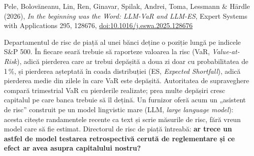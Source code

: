 
\renewcommand{\emqacase}{\T{Research case 5 (Lecture 12)}{Studiul de caz 5 (cursul 12)}}

%
          { Pele, Bolovăneanu, Lin, Ren, Ginavar, Spilak, Andrei, Toma, Lessmann \& Härdle (2026), \emph{In the beginning was the Word: LLM-VaR and LLM-ES},
           Expert Systems with Applications 295, 128676, \href{https://doi.org/10.1016/j.eswa.2025.128676}{doi:10.1016/j.eswa.2025.128676}}

\begin{scenario}
%
{Departamentul de risc de piață al unei bănci deține o poziție lungă pe indicele S\&P 500. În fiecare seară trebuie să raporteze valoarea la risc (VaR, \emph{Value-at-Risk}), adică pierderea care ar trebui depășită a doua zi doar cu probabilitatea de 1\,\%, și pierderea așteptată în coada distribuției (ES, \emph{Expected Shortfall}), adică pierderea medie din zilele în care VaR este depășită.
Autoritatea de supraveghere compară trimestrial VaR cu pierderile realizate; prea multe depășiri cresc capitalul pe care banca trebuie să îl dețină.
Un furnizor oferă acum un „asistent de risc” construit pe un model lingvistic mare (LLM, \emph{large language model}): acesta citește randamentele recente ca text și scrie măsurile de risc, fără vreun model care să fie estimat.
Directorul de risc de piață întreabă: \textbf{ar trece un astfel de model testarea retrospectivă cerută de reglementare și ce efect ar avea asupra capitalului nostru?}}
\end{scenario}

